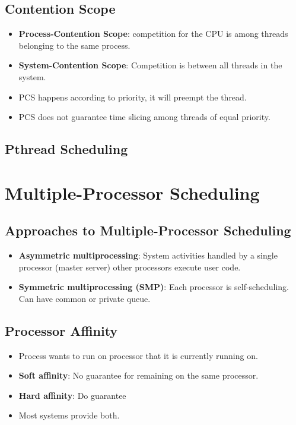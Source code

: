 \documentclass[10pt]{report}
\begin{document}
		\subsection{Contention Scope}
			\begin{itemize}
				\item \textbf{Process-Contention Scope}: competition for the CPU is among threads belonging to the same process.
				\item \textbf{System-Contention Scope}: Competition is between all threads in the system.
				\item PCS happens according to priority, it will preempt the thread.
				\item PCS does not guarantee time slicing among threads of equal priority.
			\end{itemize}

		\subsection{Pthread Scheduling}

	\section{Multiple-Processor Scheduling}
		\subsection{Approaches to Multiple-Processor Scheduling}
			\begin{itemize}
				\item \textbf{Asymmetric multiprocessing}: System activities handled by a single processor (master server) other processors execute user code.
				\item \textbf{Symmetric multiprocessing (SMP)}: Each processor is self-scheduling. Can have common or private queue.
			\end{itemize}

		\subsection{Processor Affinity}
			\begin{itemize}
				\item Process wants to run on processor that it is currently running on.
				\item \textbf{Soft affinity}: No guarantee for remaining on the same processor.
				\item \textbf{Hard affinity}: Do guarantee
				\item Most systems provide both.
			\end{itemize}
\end{document}
